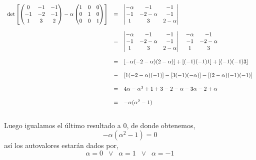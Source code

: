\begin{enumerate}
    $$ \begin{array}{rcl} 
	\det \left[
    \begin{pmatrix}
	0 & -1 & -1 \\
	-1 & -2 & -1 \\
	1 & 3 & 2 
    \end{pmatrix} - \alpha 
    \begin{pmatrix}
	1 & 0 & 0 \\
	0 & 1 & 0 \\
	0 & 0 & 1 
\end{pmatrix} \right] & = & 
    \begin{vmatrix}
	-\alpha & -1 & -1 \\
	-1 & -2-\alpha & -1 \\
	1 & 3 & 2-\alpha 
	\end{vmatrix} \\\\ 
	&=&  
	\begin{vmatrix}
	    -\alpha & -1 & -1 \\
	    -1 & -2-\alpha & -1 \\
	    1 & 3 & 2-\alpha 
	\end{vmatrix} \hspace{.4cm} 
	\begin{matrix}
	     -\alpha & -1 \\
	     -1 & -2-\alpha \\
	     1 & 3 \\ 
	\end{matrix}\\\\
	&=&\left[-\alpha (-2-\alpha)(2-\alpha)\right] + \left[(-1)(-1)1\right] + \left[(-1)(-1)3\right]\\\\
	&-&\left[1(-2-\alpha)(-1)\right]-\left[3(-1)(-\alpha)\right]-\left[(2-\alpha)(-1)(-1)\right]\\\\
	&=&4\alpha-\alpha^3 + 1 + 3 - 2 - \alpha - 3\alpha - 2+\alpha\\\\
	&=& -\alpha(\alpha^2-1)\\
    \end{array}$$\\

    Luego igualamos el último resultado a $0$, de donde obtenemos,\\
    $$-\alpha(\alpha^2-1)=0$$ 
    así los autovalores estarán dados por,
    $$\alpha=0 \;\; \lor\;\; \alpha=1 \;\;\lor\;\; \alpha=-1$$\\


\end{enumerate}
